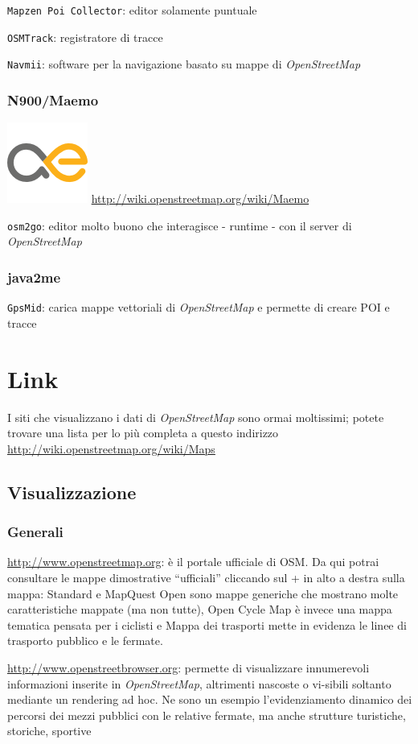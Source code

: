 \documentclass[a4paper,twoside,12pt,]{article}
\newcommand{\osm}{\emph{OpenStreetMap}\xspace}
\newcommand{\soft}[1]{\texttt{#1}}
\begin{document}
\soft{Mapzen Poi Collector}: editor solamente puntuale

\soft{OSMTrack}: registratore di tracce

\soft{Navmii}: software per la navigazione basato su mappe di \osm
\subsubsection{N900/Maemo} 
\includegraphics{./maemo-logo.png} \url{http://wiki.openstreetmap.org/wiki/Maemo}

\soft{osm2go}: editor molto buono che interagisce - runtime - con il server di \osm

\subsubsection{java2me}

\soft{GpsMid}: carica mappe vettoriali di \osm e permette di creare POI e tracce

\section{Link}
I siti che visualizzano i dati di \osm sono ormai moltissimi; potete trovare una lista per lo più completa a questo indirizzo \url{http://wiki.openstreetmap.org/wiki/Maps}
\subsection{Visualizzazione}
\subsubsection{Generali}
\url{http://www.openstreetmap.org}: è il portale ufficiale di OSM. Da qui potrai consultare le mappe dimostrative “ufficiali” cliccando sul + in alto a destra sulla mappa:
Standard e MapQuest Open sono mappe generiche che mostrano molte caratteristiche mappate (ma non tutte), Open Cycle Map è invece una mappa tematica pensata per i ciclisti e Mappa dei trasporti mette in evidenza le linee di trasporto
pubblico e le fermate.

\url{http://www.openstreetbrowser.org}: permette di visualizzare innumerevoli informazioni inserite in \osm, altrimenti nascoste o vi-sibili soltanto mediante un rendering ad hoc. Ne sono un esempio l'evidenziamento dinamico dei percorsi dei mezzi pubblici con le relative fermate, ma anche strutture turistiche, storiche, sportive
\end{document}
